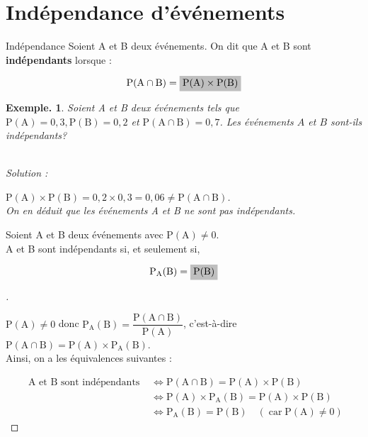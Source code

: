 \documentclass[12pt]{article}
\theoremstyle{break}
\newtheorem*{example}{Exemple.}
\newenvironment{demo}[1][\proofname]{%
  \begin{proof}[#1]$ $\newline
  }{%
  \end{proof}
}
\begin{document}
\section{Indépendance d'événements}
\begin{definition}{Indépendance}{}
Soient A et B deux événements. On dit que A et B sont \textbf{indépendants} lorsque :

$$
\mathrm{P}(\mathrm{A} \cap \mathrm{B})=\hideM{\mathrm{P}(\mathrm{A}) \times \mathrm{P}(\mathrm{B})}
$$

\end{definition}
\begin{example}
Soient A et B deux événements tels que $\mathrm{P}(\mathrm{A})=0,3, \mathrm{P}(\mathrm{B})=0,2$ et $\mathrm{P}(\mathrm{A} \cap \mathrm{B})=0,7$. Les événements $A$ et $B$ sont-ils indépendants?

~\\Solution :

$\mathrm{P}(\mathrm{A}) \times \mathrm{P}(\mathrm{B})=0,2 \times 0,3=0,06 \neq \mathrm{P}(\mathrm{A} \cap \mathrm{B})$.\\
On en déduit que les événements A et B ne sont pas indépendants.
\end{example}

\begin{proposition}{}{}
Soient A et B deux événements avec $\mathrm{P}(\mathrm{A}) \neq 0$.\\
A et B sont indépendants si, et seulement si,

$$
\mathrm{P}_{\mathrm{A}}(\mathrm{B})=\hideM{\mathrm{P}(\mathrm{B})}
$$
\end{proposition}

\begin{demo}
$\mathrm{P}(\mathrm{A}) \neq 0$ donc $\mathrm{P}_{\mathrm{A}}(\mathrm{B})=\dfrac{\mathrm{P}(\mathrm{A} \cap \mathrm{B})}{\mathrm{P}(\mathrm{A})}$, c'est-à-dire $\mathrm{P}(\mathrm{A} \cap \mathrm{B})=\mathrm{P}(\mathrm{A}) \times \mathrm{P}_{\mathrm{A}}(\mathrm{B})$.\\
Ainsi, on a les équivalences suivantes :

$$
\begin{aligned}
\text { A et } \mathrm{B} \text { sont indépendants } & \Longleftrightarrow \mathrm{P}(\mathrm{A} \cap \mathrm{B})=\mathrm{P}(\mathrm{A}) \times \mathrm{P}(\mathrm{B}) \\
& \Longleftrightarrow \mathrm{P}(\mathrm{A}) \times \mathrm{P}_{\mathrm{A}}(\mathrm{B})=\mathrm{P}(\mathrm{A}) \times \mathrm{P}(\mathrm{B}) \\
& \Longleftrightarrow \mathrm{P}_{\mathrm{A}}(\mathrm{B})=\mathrm{P}(\mathrm{B}) \quad(\operatorname{car} \mathrm{P}(\mathrm{A}) \neq 0)
\end{aligned}
$$
\end{demo}
\end{document}
